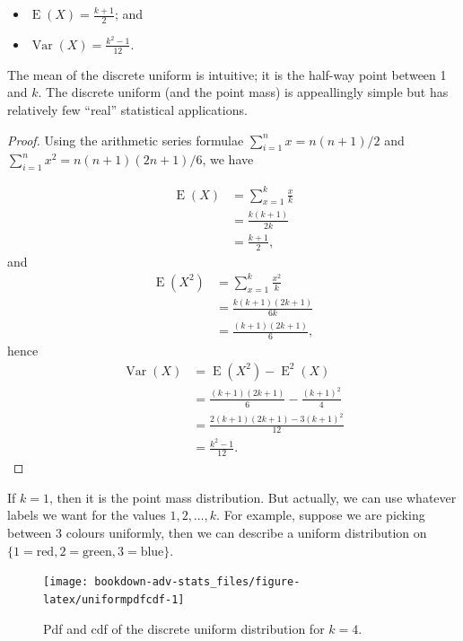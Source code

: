 \documentclass[
]{book}
\providecommand{\tightlist}{%
  \setlength{\itemsep}{0pt}\setlength{\parskip}{0pt}}
\DeclareMathOperator{\E}{E}
\DeclareMathOperator{\Var}{Var}
\theoremstyle{definition}
\theoremstyle{definition}
\theoremstyle{definition}
\theoremstyle{definition}
\theoremstyle{remark}
\begin{document}
\begin{itemize}
\tightlist
\item
  \(\E(X)=\frac{k+1}{2}\); and
\item
  \(\Var(X)=\frac{k^2-1}{12}\).
\end{itemize}

The mean of the discrete uniform is intuitive; it is the half-way point between 1 and \(k\).
The discrete uniform (and the point mass) is appeallingly simple but has relatively few ``real'' statistical applications.

\begin{proof}
Using the arithmetic series formulae \(\sum_{i=1}^n x = n(n+1)/2\) and \(\sum_{i=1}^n x^2 = n(n+1)(2n+1)/6\), we have

\begin{align*}
\E(X) &= \sum_{x=1}^k \frac{x}{k}\\
&= \frac{k(k+1)}{2k}  \\
&= \frac{k+1}{2},
\end{align*}
and
\begin{align*}
\E(X^2) &= \sum_{x=1}^k  \frac{x^2}{k}\\
&= \frac{k(k+1)(2k+1)}{6k}  \\
&= \frac{(k+1)(2k+1)}{6},
\end{align*}
hence
\begin{align*}
\Var(X) &= \E(X^2) - \E^2(X) \\
&= \frac{(k+1)(2k+1)}{6} - \frac{(k+1)^2}{4} \\
&= \frac{2(k+1)(2k+1)-3(k+1)^2}{12} \\
&= \frac{k^2-1}{12}.
\end{align*}
\end{proof}

If \(k=1\), then it is the point mass distribution. But actually, we can use whatever labels we want for the values \(1,2,\dots,k\). For example, suppose we are picking between 3 colours uniformly, then we can describe a uniform distribution on \(\{1 = \text{red}, 2= \text{green}, 3=\text{blue} \}\).

\begin{figure}

{\centering \texttt{[image: bookdown-adv-stats\_files/figure-latex/uniformpdfcdf-1]} 

}

\caption{Pdf and cdf of the discrete uniform distribution for \(k=4\).}\label{fig:uniformpdfcdf}
\end{figure}
\end{document}
